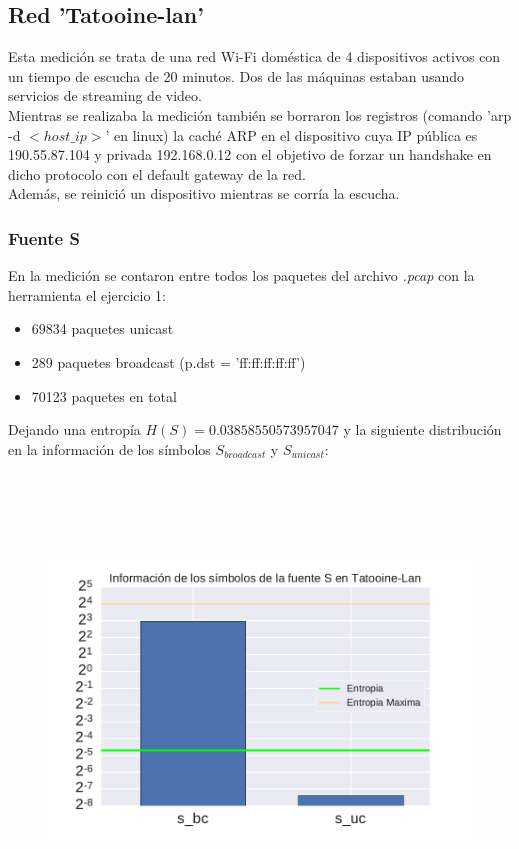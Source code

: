 \subsection{Red 'Tatooine-lan'}
Esta medición se trata de una red Wi-Fi doméstica de 4 dispositivos activos con un tiempo de escucha de 20 minutos. Dos de las máquinas estaban usando servicios de streaming de video.
\\

Mientras se realizaba la medición también se borraron los registros (comando 'arp -d $<host\_ip>$' en linux) la caché ARP en el dispositivo cuya IP pública es 190.55.87.104 y privada 192.168.0.12 con el objetivo de forzar un handshake en dicho protocolo con el default gateway de la red.
\\

Además, se reinició un dispositivo mientras se corría la escucha.

\subsubsection{Fuente S}
En la medición se contaron entre todos los paquetes del archivo \emph{.pcap} con la herramienta el ejercicio 1:

        \begin{itemize}
            \item 69834 paquetes unicast
            \item 289 paquetes broadcast (p.dst = 'ff:ff:ff:ff:ff')
            \item 70123 paquetes en total
        \end{itemize}

Dejando una entropía $H(S) = 0.03858550573957047$ y la siguiente distribución en la información de los símbolos $S_{broadcast}$ y $S_{unicast}$:

\begin{figure}[H]
	\includegraphics[width=15cm, height=12cm, keepaspectratio]{../img/barras-Tatooine-Lan.pdf}
\end{figure}

